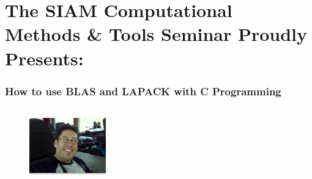 \documentclass[10pt]{beamer}
\begin{document}
\section{The SIAM Computational Methods \& Tools Seminar Proudly Presents:}
\begin{frame}
\frametitle{How to use BLAS and LAPACK with C Programming}

\vskip-0.6cm

\begin{columns}[t]
	\begin{column}{.3\textwidth}
		\begin{block}
		\centering
		\begin{figure}
			\includegraphics[width=1.3in,height=1in]{Henry.jpeg}
		\end{figure}
% 


\end{block}
\end{column}
\end{columns}
\end{frame}
\end{document}
